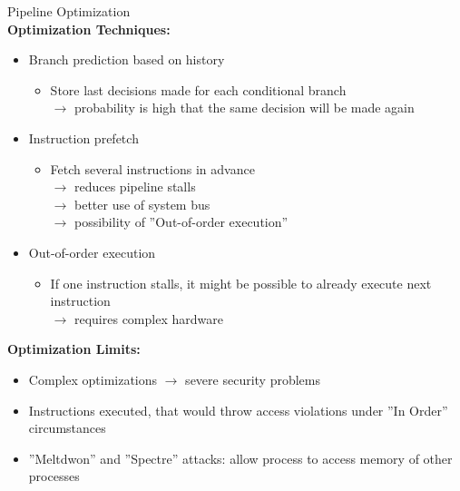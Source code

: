 \begin{corollary}{Pipeline Optimization}\\
\textbf{Optimization Techniques:}
\begin{itemize}
  \item Branch prediction based on history
  \begin{itemize}
    \item Store last decisions made for each conditional branch
    \\$\rightarrow$ probability is high that the same decision will be made again
  \end{itemize}
  \item Instruction prefetch
  \begin{itemize}
    \item Fetch several instructions in advance
    \\$\rightarrow$ reduces pipeline stalls
    \\$\rightarrow$ better use of system bus
    \\$\rightarrow$ possibility of ''Out-of-order execution''
  \end{itemize}
  \item Out-of-order execution
  \begin{itemize}
    \item If one instruction stalls, it might be possible to already execute next instruction
    \\$\rightarrow$ requires complex hardware
  \end{itemize}
\end{itemize}

\textbf{Optimization Limits:}
\begin{itemize}
  \item Complex optimizations $\rightarrow$ severe security problems 
  \item Instructions executed, that would throw access violations under ''In Order'' circumstances
  \item ''Meltdwon'' and ''Spectre'' attacks: allow process to access memory of other processes
\end{itemize}
\end{corollary}


